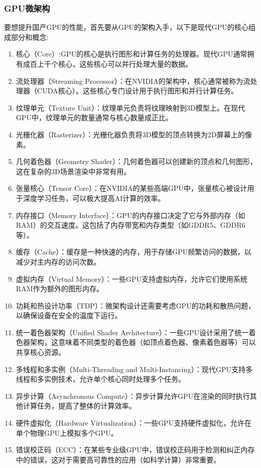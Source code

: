 \subsubsection{GPU微架构}

要想提升国产GPU的性能，首先要从GPU的架构入手，以下是现代GPU的核心组成部分和概念:
\begin{enumerate}
    \item 核心（Core）:GPU的核心是执行图形和计算任务的处理器。现代GPU通常拥有成百上千个核心，这些核心可以并行处理大量的数据。
    \item 流处理器（Streaming Processor）：在NVIDIA的架构中，核心通常被称为流处理器（CUDA核心）。这些核心专门设计用于执行图形和并行计算任务。
    \item 纹理单元（Texture Unit）：纹理单元负责将纹理映射到3D模型上。在现代GPU中，纹理单元的数量通常与核心数量成正比。
    \item 光栅化器（Rasterizer）：光栅化器负责将3D模型的顶点转换为2D屏幕上的像素。
    \item 几何着色器（Geometry Shader）：几何着色器可以创建新的顶点和几何图形，这在复杂的3D场景渲染中非常有用。
    \item 张量核心（Tensor Core）：在NVIDIA的某些高端GPU中，张量核心被设计用于深度学习任务，可以极大提高AI计算的效率。
    \item 内存接口（Memory Interface）：GPU的内存接口决定了它与外部内存（如RAM）的交互速度。这包括了内存带宽和内存类型（如GDDR5、GDDR6等）。
    \item 缓存（Cache）：缓存是一种快速的内存，用于存储GPU频繁访问的数据，以减少对主内存的访问次数。
    \item 虚拟内存（Virtual Memory）：一些GPU支持虚拟内存，允许它们使用系统RAM作为额外的图形内存。
    \item 功耗和热设计功率（TDP）：微架构设计还需要考虑GPU的功耗和散热问题，以确保设备在安全的温度下运行。
    \item 统一着色器架构（Unified Shader Architecture）：一些GPU设计采用了统一着色器架构，这意味着不同类型的着色器（如顶点着色器、像素着色器等）可以共享核心资源。
    \item 多线程和多实例（Multi-Threading and Multi-Instancing）：现代GPU支持多线程和多实例技术，允许单个核心同时处理多个任务。
    \item 异步计算（Asynchronous Compute）：异步计算允许GPU在渲染的同时执行其他计算任务，提高了整体的计算效率。
    \item 硬件虚拟化（Hardware Virtualization）：一些GPU支持硬件虚拟化，允许在单个物理GPU上模拟多个GPU。
    \item 错误校正码（ECC）：在某些专业级GPU中，错误校正码用于检测和纠正内存中的错误，这对于需要高可靠性的应用（如科学计算）非常重要。
\end{enumerate}

